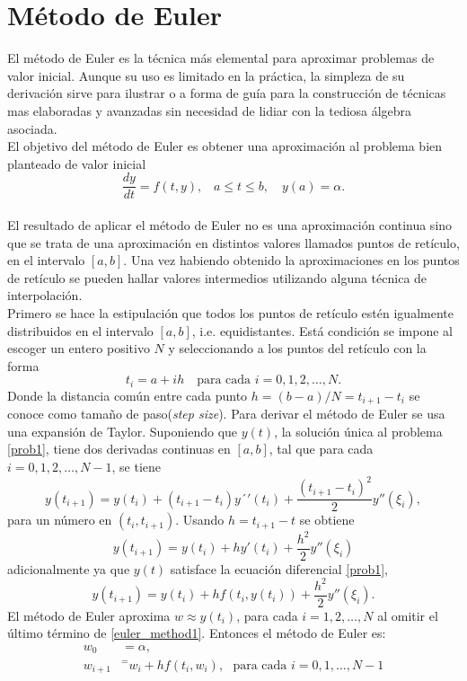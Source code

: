 \documentclass[a4paper]{article}
\begin{document}
\section{Método de Euler}
El método de Euler es la técnica más elemental para aproximar problemas de valor inicial. Aunque su uso es limitado en la práctica, la simpleza de su derivación sirve para ilustrar o a forma de guía para la construcción de técnicas mas elaboradas y avanzadas sin necesidad de lidiar con la tediosa álgebra asociada.\\
El objetivo del método de Euler es obtener una aproximación al problema bien planteado de valor inicial
\begin{equation}\label{prob1}
\frac{dy}{dt}=f(t,y), \,\,\,\,\, a \leq t \leq b, \,\,\,\,\,\, y(a)=\alpha.
\end{equation}\\
El resultado de aplicar el método de Euler no es una aproximación continua sino que se trata de una aproximación en distintos valores llamados puntos de retículo, en el intervalo $[a,b]$. Una vez habiendo obtenido la aproximaciones en los puntos de retículo se pueden hallar valores intermedios utilizando alguna técnica de interpolación.\\
Primero se hace la estipulación que todos los puntos de retículo estén igualmente distribuidos en el intervalo $[a,b]$, i.e. equidistantes. Está condición se impone al escoger un entero positivo $N$ y seleccionando a los puntos del retículo con la forma
\begin{equation*}
t_i =a +i h \,\,\,\,\,\, \text{para cada } i=0,1,2,\hdots, N.
\end{equation*}
Donde la distancia común entre cada punto $h=(b-a)/N=t_{i+1}-t_i$ se conoce como tamaño de paso(\textit{step size}). Para derivar el método de Euler se usa una expansión de Taylor. Suponiendo que $y(t)$, la solución única al problema \ref{prob1}, tiene dos derivadas continuas en $[a,b]$, tal que para cada $i=0,1,2,\hdots, N-1$, se tiene
\begin{equation*}
y(t_{i+1})=y(t_i)+(t_{i+1}-t_i)y´'(t_i) + \frac{(t_{i+1}-t_i)^2}{2}y''(\xi_i),
\end{equation*}
para un número en $(t_i, t_{i+1})$. Usando $h=t_{i+1}-t$ se obtiene
\begin{equation*}
y(t_{i+1})=y(t_i)+h y'(t_i)+\frac{h^2}{2}y''(\xi_i)
\end{equation*}
adicionalmente ya que $y(t)$ satisface la ecuación diferencial \ref{prob1},
\begin{equation}\label{euler_method1}
y(t_{i+1})=y(t_i)+ h f(t_i,y(t_i))+\frac{h^2}{2}y''(\xi_i).
\end{equation}
El método de Euler aproxima $w\approx y(t_i)$, para cada $i=1,2,\hdots, N$ al omitir el último término de \ref{euler_method1}. Entonces el método de Euler es:
\begin{equation}
\begin{split}
 w_0&=\alpha,\\
 w_{i+1}&^=w_i+h f(t_i, w_i), \,\,\,\, \text{para cada } i=0,1,\hdots, N-1 
\end{split}
\end{equation} 
\end{document}
